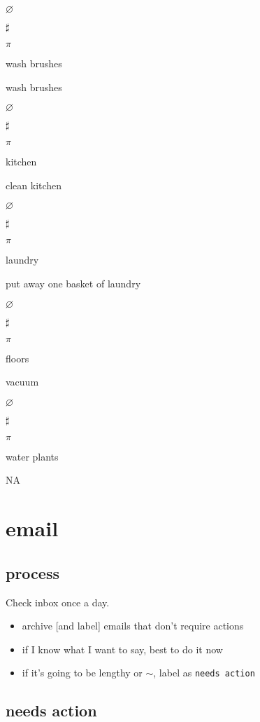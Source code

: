 \documentclass[]{book}
\providecommand{\tightlist}{%
  \setlength{\itemsep}{0pt}\setlength{\parskip}{0pt}}
\begin{document}
\(\varnothing\)

\(\sharp\)

\(\pi\)

wash brushes

wash brushes

\(\varnothing\)

\(\sharp\)

\(\pi\)

kitchen

clean kitchen

\(\varnothing\)

\(\sharp\)

\(\pi\)

laundry

put away one basket of laundry

\(\varnothing\)

\(\sharp\)

\(\pi\)

floors

vacuum

\(\varnothing\)

\(\sharp\)

\(\pi\)

water plants

NA

\hypertarget{email}{%
\section{email}\label{email}}

\hypertarget{process}{%
\subsection{process}\label{process}}

Check inbox once a day.

\begin{itemize}
\tightlist
\item
  archive {[}and label{]} emails that don't require actions
\item
  if I know what I want to say, best to do it now
\item
  if it's going to be lengthy or \(\sim\), label as \texttt{needs\ action}
\end{itemize}

\hypertarget{needs-action}{%
\subsection{needs action}\label{needs-action}}
\end{document}
